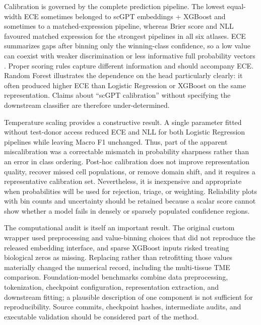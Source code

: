 Calibration is governed by the complete prediction pipeline. The lowest equal-width ECE sometimes belonged to scGPT embeddings + XGBoost and sometimes to a matched-expression pipeline, whereas Brier score and NLL favoured matched expression for the strongest pipelines in all six atlases. ECE summarizes gaps after binning only the winning-class confidence, so a low value can coexist with weaker discrimination or less informative full probability vectors \citep{Vaicenavicius2019,SilvaFilho2023}. Proper scoring rules capture different information and should accompany ECE. Random Forest illustrates the dependence on the head particularly clearly: it often produced higher ECE than Logistic Regression or XGBoost on the same representation. Claims about ``scGPT calibration'' without specifying the downstream classifier are therefore under-determined.

Temperature scaling provides a constructive result. A single parameter fitted without test-donor access reduced ECE and NLL for both Logistic Regression pipelines while leaving Macro F1 unchanged. Thus, part of the apparent miscalibration was a correctable mismatch in probability sharpness rather than an error in class ordering. Post-hoc calibration does not improve representation quality, recover missed cell populations, or remove domain shift, and it requires a representative calibration set. Nevertheless, it is inexpensive and appropriate when probabilities will be used for rejection, triage, or weighting. Reliability plots with bin counts and uncertainty should be retained because a scalar score cannot show whether a model fails in densely or sparsely populated confidence regions.

The computational audit is itself an important result. The original custom wrapper used preprocessing and value-binning choices that did not reproduce the released embedding interface, and sparse XGBoost inputs risked treating biological zeros as missing. Replacing rather than retrofitting those values materially changed the numerical record, including the multi-tissue TME comparison. Foundation-model benchmarks combine data preprocessing, tokenization, checkpoint configuration, representation extraction, and downstream fitting; a plausible description of one component is not sufficient for reproducibility. Source commits, checkpoint hashes, intermediate audits, and executable validation should be considered part of the method.

